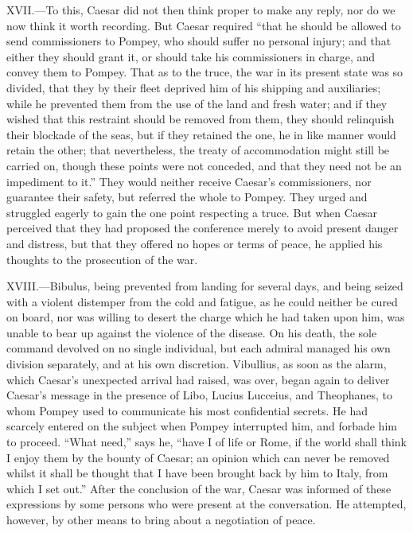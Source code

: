 XVII.—To this, Caesar did not then think proper to make any reply, nor
do we now think it worth recording. But Caesar required ``that he should
be allowed to send commissioners to Pompey, who should suffer no
personal injury; and that either they should grant it, or should take
his commissioners in charge, and convey them to Pompey. That as to the
truce, the war in its present state was so divided, that they by their
fleet deprived him of his shipping and auxiliaries; while he prevented
them from the use of the land and fresh water; and if they wished that
this restraint should be removed from them, they should relinquish their
blockade of the seas, but if they retained the one, he in like manner
would retain the other; that nevertheless, the treaty of accommodation
might still be carried on, though these points were not conceded, and
that they need not be an impediment to it.'' They would neither receive
Caesar's commissioners, nor guarantee their safety, but referred the
whole to Pompey. They urged and struggled eagerly to gain the one point
respecting a truce. But when Caesar perceived that they had proposed the
conference merely to avoid present danger and distress, but that they
offered no hopes or terms of peace, he applied his thoughts to the
prosecution of the war.

XVIII.—Bibulus, being prevented from landing for several days, and
being seized with a violent distemper from the cold and fatigue, as he
could neither be cured on board, nor was willing to desert the charge
which he had taken upon him, was unable to bear up against the violence
of the disease. On his death, the sole command devolved on no single
individual, but each admiral managed his own division separately, and at
his own discretion. Vibullius, as soon as the alarm, which Caesar's
unexpected arrival had raised, was over, began again to deliver Caesar's
message in the presence of Libo, Lucius Lucceius, and Theophanes, to
whom Pompey used to communicate his most confidential secrets. He had
scarcely entered on the subject when Pompey interrupted him, and forbade
him to proceed. ``What need,'' says he, ``have I of life or Rome, if the
world shall think I enjoy them by the bounty of Caesar; an opinion which
can never be removed whilst it shall be thought that I have been brought
back by him to Italy, from which I set out.'' After the conclusion of the
war, Caesar was informed of these expressions by some persons who were
present at the conversation. He attempted, however, by other means to
bring about a negotiation of peace.

